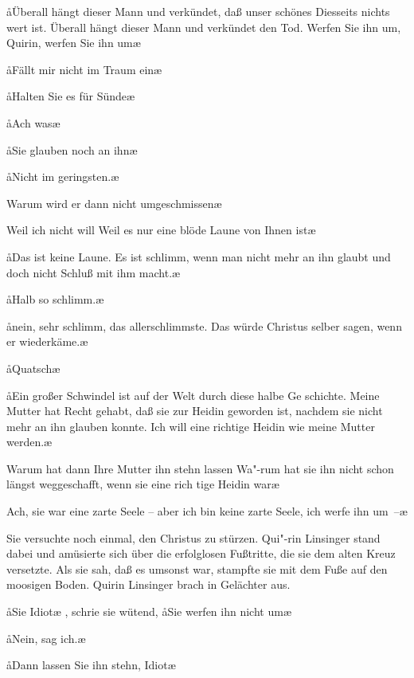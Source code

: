 \aa{}Überall hängt dieser Mann und verkündet, daß unser schönes
Diesseits nichts wert ist. Überall hängt dieser Mann und
verkündet den Tod. Werfen Sie ihn um, Quirin, werfen Sie
ihn um\ausr{}\ae{}

\aa{}Fällt mir nicht im Traum ein\ausr{}\ae{}

\aa{}Halten Sie es für Sünde\frag{}\ae{}

\aa{}Ach was\ausr{}\ae{}

\aa{}Sie glauben noch an ihn\frag{}\ae{}

\aa{}Nicht im geringsten.\ae{}

\aanah{}Warum wird er dann nicht umgeschmissen\frag{}\ae{}

\aanah{}Weil ich nicht will\ausr{} Weil es nur eine blöde Laune von
Ihnen ist\ausr{}\ae{}

\aa{}Das ist keine Laune. Es ist schlimm, wenn man nicht mehr
an ihn glaubt und doch nicht Schluß mit ihm macht.\ae{}

\aa{}Halb so schlimm.\ae{}

\aa{}nein, sehr schlimm, das allerschlimmste. Das würde Christus
selber sagen, wenn er wiederkäme.\ae{}

\aa{}Quatsch\ausr{}\ae{}

\aa{}Ein großer Schwindel ist auf der Welt durch diese halbe Ge\-%
schichte. Meine Mutter hat Recht gehabt, daß sie zur Heidin
geworden ist, nachdem sie nicht mehr an ihn glauben konnte.
Ich will eine richtige Heidin wie meine Mutter werden.\ae{}

\aanah{}Warum hat dann Ihre Mutter ihn stehn lassen\frag{} Wa"-rum
hat sie ihn nicht schon längst weggeschafft, wenn sie eine rich\-%
tige Heidin war\frag{}\ae{}

\aanah{}Ach, sie war eine zarte Seele -- aber ich bin keine zarte Seele,
ich werfe ihn um~--\ae{}

Sie versuchte noch einmal, den Christus zu stürzen. Qui"-rin
Linsinger stand dabei und amüsierte sich über die erfolglosen
Fußtritte, die sie dem alten Kreuz versetzte. Als sie sah, daß
es umsonst war, stampfte sie mit dem Fuße auf den moosigen
Boden. Quirin Linsinger brach in Gelächter aus.

\aa{}Sie Idiot\ae{}%
\eingriff{S39-1}{Idiot\ae{}, ] Idiot,\ae{}}%
, schrie sie wütend, \aa{}Sie werfen ihn nicht um\frag{}\ae{}

\aa{}Nein, sag ich.\ae{}

\aa{}Dann lassen Sie ihn stehn, Idiot\ausr{}\ae{}

